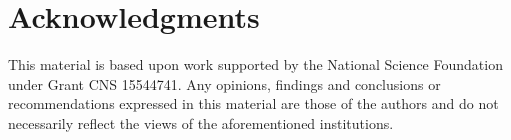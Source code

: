 \documentclass[conference]{IEEEtran}
\begin{document}
\section*{Acknowledgments}
This material is based upon work supported by the National Science Foundation under Grant CNS 15544741. Any opinions, findings and conclusions or
recommendations expressed in this material are those of the authors and do
not necessarily reflect the views of the aforementioned institutions.
%
\end{document}
